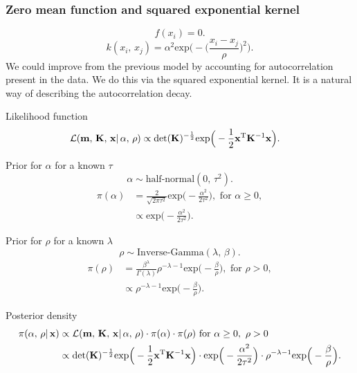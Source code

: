       \subsubsection{Zero mean function and squared exponential kernel}

         \[f(x_{i}) = 0.\]
         \[k(x_{i},\, x_{j}) = \alpha^{2} \text{exp} \bigg(- \Big(\frac{x_i - x_j}{\rho} \Big)^2 \bigg).\]
         We could improve from the previous model by accounting for autocorrelation present in the data. We do this via the squared exponential kernel. It is a natural way of describing the autocorrelation decay.

         Likelihood function
         \begin{align*}
         \mathcal{L}(\mathbf{m} ,\, \mathbf{K} ,\, \mathbf{x}| \, \alpha ,\, \rho)
         & \propto \text{det}(\mathbf{K})^{-\frac{1}{2}} 
         \text{exp} \Big(-\frac{1}{2} \mathbf{x}^{\text{\text{T}}} \mathbf{K}^{-1} \mathbf{x} \Big).
         \end{align*}

         Prior for \(\alpha\) for a known \(\tau\)
         \[\alpha \sim \text{half-normal} (0, \, \tau^2).\]
         \begin{align*}
            \pi(\alpha) 
            & = \frac{2}{\sqrt{2\pi\tau^2}} \text{exp} \Big(-\frac{\alpha^2}{2\tau^2} \Big), \text{ for } \alpha \geq 0,\\
            & \propto \text{exp} \Big(-\frac{\alpha^2}{2\tau^2} \Big).
         \end{align*}

         Prior for \(\rho\) for a known \(\lambda\)
         \[\rho \sim \text{Inverse-Gamma}(\lambda, \, \beta).\]
         \begin{align*}
            \pi(\rho)
            & = \frac{\beta^{\lambda}}{\Gamma(\lambda)} \rho^{-\lambda-1} \text{exp} \Big(-\frac{\beta}{\rho} \Big), \text{ for } \rho > 0,\\
            & \propto \rho^{-\lambda-1} \text{exp} \Big(-\frac{\beta}{\rho} \Big).
         \end{align*}

         Posterior density
         \begin{align*}
            \pi(\alpha,\, \rho| \, \mathbf{x}) 
            & \propto \mathcal{L}(\mathbf{m},\, \mathbf{K},\, \mathbf{x}| \, \alpha,\, \rho) 
            \cdot \pi(\alpha) 
            \cdot \pi(\rho) 
            \text{ for } \alpha \geq 0,\ \rho > 0\\
            & \propto \text{det}(\mathbf{K})^{-\frac{1}{2}} 
            \text{exp} \Big(-\frac{1}{2} \mathbf{x}^{\text{\text{T}}} \mathbf{K}^{-1} \mathbf{x} \Big)
            \cdot \text{exp} \Big(-\frac{\alpha^2}{2\tau^2} \Big) 
            \cdot \rho^{-\lambda-1} \text{exp} \Big(-\frac{\beta}{\rho} \Big).
         \end{align*}

